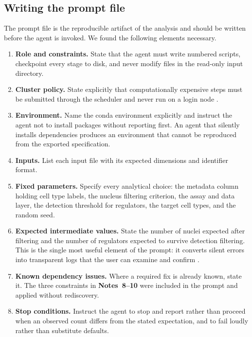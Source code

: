 \subsection{Writing the prompt file}

The prompt file is the reproducible artifact of the analysis and should be written before the agent is invoked. We found the following elements necessary.

\begin{enumerate}[leftmargin=*]
\item \textbf{Role and constraints.} State that the agent must write numbered scripts, checkpoint every stage to disk, and never modify files in the read-only input directory.

\item \textbf{Cluster policy.} State explicitly that computationally expensive steps must be submitted through the scheduler and never run on a login node .

\item \textbf{Environment.} Name the conda environment explicitly and instruct the agent not to install packages without reporting first. An agent that silently installs dependencies produces an environment that cannot be reproduced from the exported specification.

\item \textbf{Inputs.} List each input file with its expected dimensions and identifier format.

\item \textbf{Fixed parameters.} Specify every analytical choice: the metadata column holding cell type labels, the nucleus filtering criterion, the assay and data layer, the detection threshold for regulators, the target cell types, and the random seed.

\item \textbf{Expected intermediate values.} State the number of nuclei expected after filtering and the number of regulators expected to survive detection filtering. This is the single most useful element of the prompt: it converts silent errors into transparent logs that the user can examine and confirm .

\item \textbf{Known dependency issues.} Where a required fix is already known, state it. The three constraints in \textbf{Notes~8--10} were included in the prompt and applied without rediscovery.

\item \textbf{Stop conditions.} Instruct the agent to stop and report rather than proceed when an observed count differs from the stated expectation, and to fail loudly rather than substitute defaults.
\end{enumerate}

